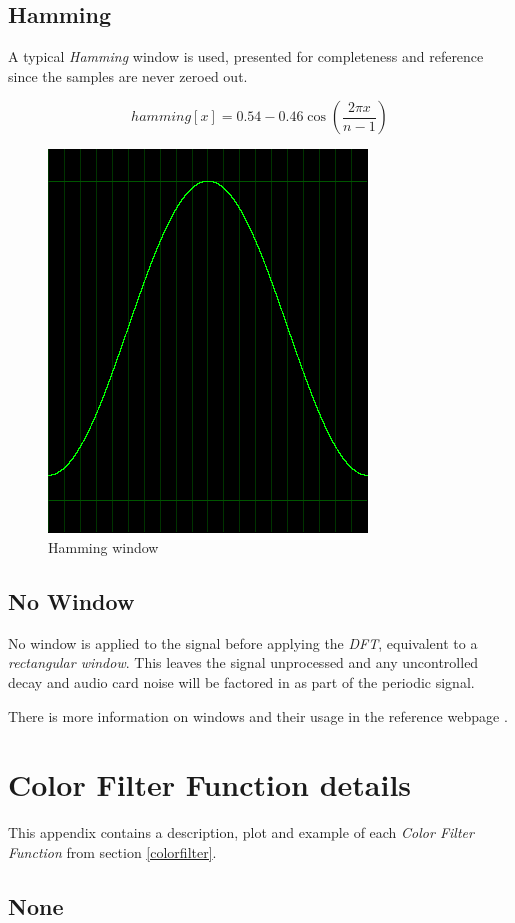 \documentclass[10pt,a4paper]{report}
\begin{document}
\begin{appendices}
\newpage
\section{Hamming}
A typical \textit{Hamming} window is used, presented for completeness and reference since the samples are never zeroed out.

\begin{equation}
hamming[x] = 0.54 - 0.46\cos(\frac{2\pi x}{n-1})
\end{equation}

\begin{figure}[H]
	\centering
	\includegraphics[width=0.4\linewidth]{images/windows/window-hamming.png}
	\caption[Hamming window]{Hamming window}
	\label{fig:window-hamming}
\end{figure}


\section{No Window}

No window is applied to the signal before applying the \textit{DFT}, equivalent to a \textit{rectangular window}. This leaves the signal unprocessed and any uncontrolled decay and audio card noise will be factored in as part of the periodic signal.

There is more information on windows and their usage in the reference webpage \cite{windowtypes}.

\chapter{Color Filter Function details}
\label{filterfunctions}

This appendix contains a description, plot and example of each \textit{Color Filter Function} from section \ref{colorfilter}.

\newpage
\section{None} 


\end{appendices}
\end{document}
